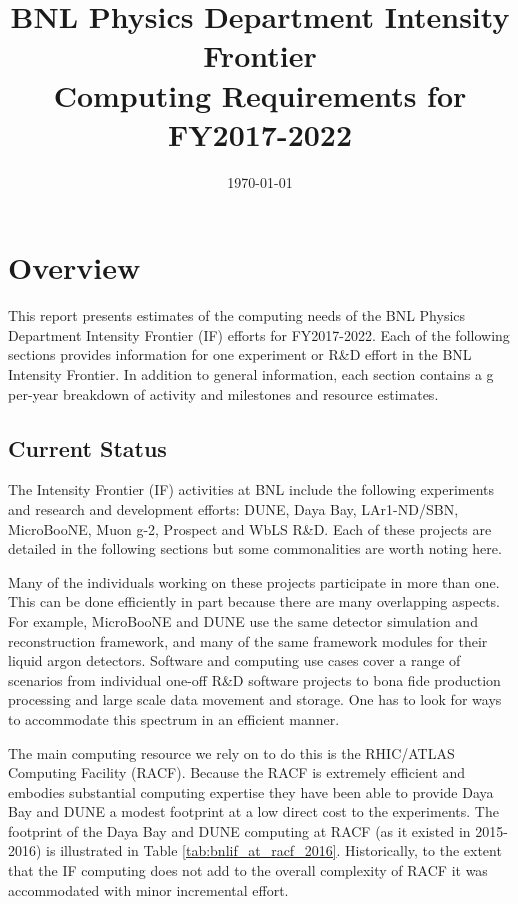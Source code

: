 \documentclass[pdftex,12pt,letter]{article}
\title{BNL Physics Department Intensity Frontier\\Computing Requirements for FY2017-2022}
\date{\today}
\begin{document}
\maketitle
\tableofcontents

%

\newpage
\section{Overview}
This report presents estimates of the computing needs of
the BNL Physics Department Intensity Frontier (IF) efforts for FY2017-2022.
Each of the following sections provides  information for one
experiment or R\&D effort in the BNL Intensity Frontier.
In addition to general information, each section contains a g per-year breakdown of activity and
milestones and resource estimates.

\subsection{Current Status}

The Intensity Frontier (IF) activities at BNL include the following
experiments and research and development efforts:
%
DUNE,
Daya Bay,
LAr1-ND/SBN,
MicroBooNE,
Muon g-2,
Prospect and
WbLS R\&D.
%
Each of these projects are detailed in the following sections but some
commonalities are worth noting here.

Many of the individuals working on these projects participate in more
than one.
This can be done efficiently in part because there are many
overlapping aspects.
For example, MicroBooNE and DUNE  use the same detector
simulation and reconstruction framework, and many of the same
framework modules for their liquid argon detectors.
Software and computing use cases cover a range of scenarios
from individual one-off R\&D software projects to bona fide production
processing and large scale data movement and storage.
One has to look for ways to accommodate this spectrum in an efficient
manner.  

The main computing resource  we rely on to do this is the RHIC/ATLAS Computing
Facility (RACF). Because the RACF is extremely efficient and embodies substantial computing
expertise they have been able to provide Daya
Bay and DUNE a modest footprint at a low direct cost to the experiments.
The footprint of the Daya Bay and DUNE computing at RACF (as it existed in 2015-2016)
is illustrated in Table \ref{tab:bnlif_at_racf_2016}. Historically, to the extent that the IF computing does not add
to the overall complexity of RACF it was accommodated with minor incremental effort.
\end{document}
